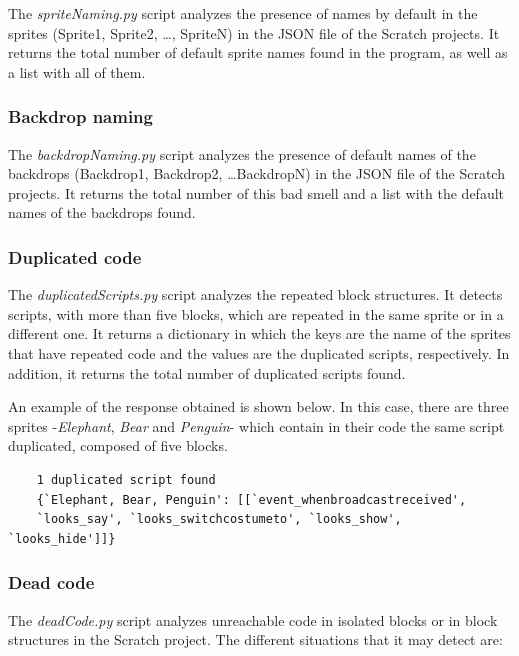 The \textit{spriteNaming.py} script analyzes the presence of names by default in the sprites (Sprite1, Sprite2, \ldots, SpriteN) in the JSON file of the Scratch projects. It returns the total number of default sprite names found in the program, as well as a list with all of them.

\subsubsection{Backdrop naming}
\label{subsubsec:backdrop_naming}

The \textit{backdropNaming.py} script analyzes the presence of default names of the backdrops (Backdrop1, Backdrop2, \ldots BackdropN) in the JSON file of the Scratch projects. It returns the total number of this bad smell and a list with the default names of the backdrops found.

\subsubsection{Duplicated code}
\label{subsubsec:dup_code}

The \textit{duplicatedScripts.py} script analyzes the repeated block structures. It detects scripts, with more than five blocks, which are repeated in the same sprite or in a different one. It returns a dictionary in which the keys are the name of the sprites that have repeated code and the values are the duplicated scripts, respectively. In addition, it returns the total number of duplicated scripts found. 

An example of the response obtained is shown below. In this case, there are three sprites -\textit{Elephant}, \textit{Bear} and \textit{Penguin}- which contain in their code the same script duplicated, composed of five blocks.

{\footnotesize
\begin{verbatim}
    1 duplicated script found
    {`Elephant, Bear, Penguin': [[`event_whenbroadcastreceived',
    `looks_say', `looks_switchcostumeto', `looks_show', `looks_hide']]}
\end{verbatim}
}

\subsubsection{Dead code}
\label{subsubsec:dead_code}

The \textit{deadCode.py} script analyzes unreachable code in isolated blocks or in block structures in the Scratch project. The different situations that it may detect are:

